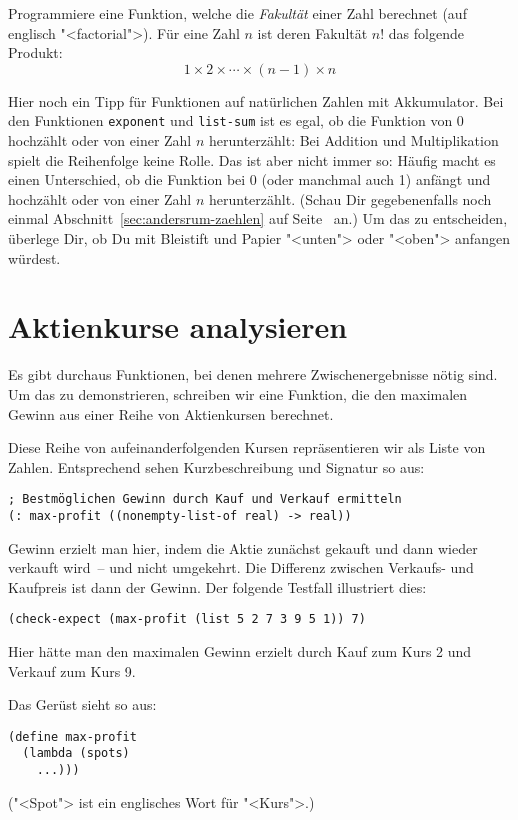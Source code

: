 \begin{aufgabeinline}
  Programmiere eine Funktion, welche die
  \textit{Fakultät} einer Zahl berechnet (auf englisch
  "<factorial">). Für eine Zahl $n$ ist deren Fakultät $n!$ das
  folgende Produkt: \[1\times 2\times \cdots \times (n-1)\times n\]
\end{aufgabeinline}

Hier noch ein Tipp für Funktionen auf natürlichen Zahlen mit
Akkumulator.  Bei den Funktionen \lstinline{exponent} und
\lstinline{list-sum} ist es egal, ob die Funktion von 0 hochzählt oder
von einer Zahl $n$ herunterzählt: Bei Addition und Multiplikation
spielt die Reihenfolge keine Rolle.  Das ist aber nicht immer so:
Häufig macht es einen Unterschied, ob die Funktion bei 0 (oder
manchmal auch 1) anfängt und hochzählt oder von einer Zahl $n$
herunterzählt.  (Schau Dir gegebenenfalls noch einmal
Abschnitt~\ref{sec:andersrum-zaehlen} auf
Seite~\pageref{sec:andersrum-zaehlen} an.)  Um das zu entscheiden,
überlege Dir, ob Du mit Bleistift und Papier "<unten"> oder "<oben">
anfangen würdest.

\section{Aktienkurse analysieren}

%
Es gibt durchaus Funktionen, bei denen mehrere Zwischenergebnisse
nötig sind.  Um das zu demonstrieren, schreiben wir eine Funktion, die
den maximalen Gewinn aus einer Reihe von Aktienkursen berechnet.

Diese Reihe von aufeinanderfolgenden Kursen repräsentieren wir als
Liste von Zahlen.  Entsprechend sehen Kurzbeschreibung und Signatur so
aus:
%
\begin{lstlisting}
; Bestmöglichen Gewinn durch Kauf und Verkauf ermitteln
(: max-profit ((nonempty-list-of real) -> real))
\end{lstlisting}
%
Gewinn erzielt man hier, indem die Aktie zunächst gekauft und dann
wieder verkauft wird~-- und nicht umgekehrt.  Die Differenz zwischen
Verkaufs- und Kaufpreis ist dann der Gewinn.  Der folgende Testfall
illustriert dies:
%
\begin{lstlisting}
(check-expect (max-profit (list 5 2 7 3 9 5 1)) 7)
\end{lstlisting}
%
Hier hätte man den maximalen Gewinn erzielt durch Kauf zum Kurs 2 und
Verkauf zum Kurs 9.

Das Gerüst sieht so aus:
%
\begin{lstlisting}
(define max-profit
  (lambda (spots)
    ...)))
\end{lstlisting}
%
("<Spot"> ist ein englisches Wort für "<Kurs">.)


